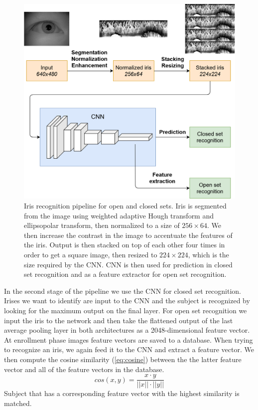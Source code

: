 \documentclass[9pt]{IEEEtran}
\begin{document}
\begin{figure}[h]
    \centering
    \includegraphics[width=1\columnwidth]{figures/iris-cnn-pipeline-compact.png}
    \caption{Iris recognition pipeline for open and closed sets. Iris is segmented from the image using weighted adaptive Hough transform and ellipsopolar transform, then normalized to a size of $256\times64$. We then increase the contrast in the image to accentuate the features of the iris. Output is then stacked on top of each other four times in order to get a square image, then resized to $224\times224$, which is the size required by the CNN. CNN is then used for prediction in closed set recognition and as a feature extractor for open set recognition.}
    \label{fig:iris-pipeline}
\end{figure}

In the second stage of the pipeline we use the CNN for closed set recognition. Irises we want to identify are input to the CNN and the subject is recognized by looking for the maximum output on the final layer. For open set recognition we input the iris to the network and then take the flattened output of the last average pooling layer in both architectures as a 2048-dimensional feature vector. At enrollment phase images feature vectors are saved to a database. When trying to recognize an iris, we again feed it to the CNN and extract a feature vector. We then compute the cosine similarity (\ref{eq:cosine}) between the the latter feature vector and all of the feature vectors in the database.
\begin{equation}
\label{eq:cosine}
    cos(x, y) = \frac { x \cdot y}{||x|| \cdot ||y||}
\end{equation}
Subject that has a corresponding feature vector with the highest similarity is matched.
\end{document}
